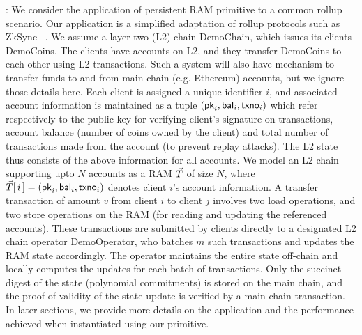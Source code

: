 \documentclass[11pt]{article}
\begin{document}
    : We consider the application of persistent RAM primitive to a common rollup scenario.
    Our application is a simplified adaptation of rollup protocols such as ZkSync ~\cite{ZkSync}.
    We assume a layer two (L2) chain \textsf{DemoChain}, which issues its clients \textsf{DemoCoins}. The clients have accounts on
    L2, and they transfer \textsf{DemoCoins} to each other using L2 transactions. Such a system will also have mechanism to transfer
    funds to and from main-chain (e.g. Ethereum) accounts, but we
    ignore those details here.
    Each client is assigned a unique identifier $i$, and associated account information  is maintained as
    a tuple $(\mathsf{pk}_i,\mathsf{bal}_i,\mathsf{txno}_i)$ which refer respectively to the public key for verifying client's signature on transactions,
    account balance (number of coins owned by the client) and total number of transactions made from the account (to prevent replay attacks).
    The L2 state thus consists of the above information for all accounts. We model an L2 chain supporting upto $N$ accounts as a RAM $\vec{T}$
    of size $N$, where $\vec{T}[\,i\,]=(\mathsf{pk}_i,\mathsf{bal}_i,\mathsf{txno}_i)$ denotes client $i$'s account information. A transfer transaction of amount $v$
    from client $i$ to client $j$ involves two load operations, and two store operations on the RAM (for reading and updating the referenced
    accounts). These transactions are submitted by clients directly to a designated L2 chain operator \textsf{DemoOperator}, who batches $m$
    such transactions and updates the RAM state accordingly. The operator maintains the entire state off-chain and locally computes the updates for
    each batch of transactions. Only the succinct digest of the state (polynomial commitments) is stored on the main chain, and the proof of
    validity of the state update is verified by a main-chain transaction. In later sections, we provide more details on the application and the
    performance achieved when instantiated using our primitive.
\end{document}
